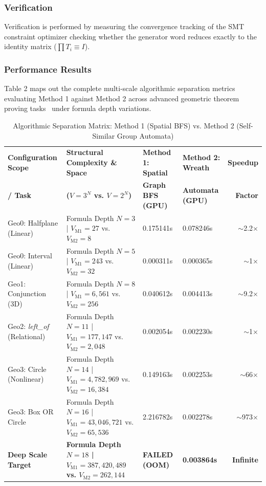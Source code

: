 \documentclass[twocolumn]{article}
\begin{document}
\subsubsection{Verification}
Verification is performed by measuring the convergence tracking of the SMT constraint optimizer checking whether the generator word reduces exactly to the identity matrix ($\prod T_i \equiv I$).

\subsubsection{Performance Results}
Table 2 maps out the complete multi-scale algorithmic separation metrics evaluating Method 1 against Method 2 across advanced geometric theorem proving tasks~\cite{pygol2024} under formula depth variations.

\begin{table}[ht]
\small
\caption{Algorithmic Separation Matrix: Method 1 (Spatial BFS) vs. Method 2 (Self-Similar Group Automata)}
\label{tab:benchmarks}
\centering
\begin{tabularx}{\textwidth}{p{4.2cm}p{4.5cm}XXr}
\toprule
\textbf{Configuration Scope} & \textbf{Structural Complexity \& Space} & \textbf{Method 1: Spatial} & \textbf{Method 2: Wreath} & \textbf{Speedup} \\
\textbf{/ Task} & \textbf{($V = 3^N$ vs. $V = 2^N$)} & \textbf{Graph BFS (GPU)} & \textbf{Automata (GPU)} & \textbf{Factor} \\
\midrule
Geo0: Halfplane (Linear) & Formula Depth $N=3$ | $V_{\text{M1}}=27$ vs. $V_{\text{M2}}=8$ & 0.175141s & 0.078246s & $\sim$2.2$\times$ \\
\addlinespace
Geo0: Interval (Linear) & Formula Depth $N=5$ | $V_{\text{M1}}=243$ vs. $V_{\text{M2}}=32$ & 0.000311s & 0.000365s & $\sim$1$\times$ \\
\addlinespace
Geo1: Conjunction (3D) & Formula Depth $N=8$ | $V_{\text{M1}}=6,561$ vs. $V_{\text{M2}}=256$ & 0.040612s & 0.004413s & $\sim$9.2$\times$ \\
\addlinespace
Geo2: \textit{left\_of} (Relational) & Formula Depth $N=11$ | $V_{\text{M1}}=177,147$ vs. $V_{\text{M2}}=2,048$ & 0.002054s & 0.002230s & $\sim$1$\times$ \\
\addlinespace
Geo3: Circle (Nonlinear) & Formula Depth $N=14$ | $V_{\text{M1}}=4,782,969$ vs. $V_{\text{M2}}=16,384$ & 0.149163s & 0.002253s & $\sim$66$\times$ \\
\addlinespace
Geo3: Box OR Circle & Formula Depth $N=16$ | $V_{\text{M1}}=43,046,721$ vs. $V_{\text{M2}}=65,536$ & 2.216782s & 0.002278s & $\sim$973$\times$ \\
\addlinespace
\textbf{Deep Scale Target} & \textbf{Formula Depth $N=18$ | $V_{\text{M1}}=387,420,489$ vs. $V_{\text{M2}}=262,144$} & \textbf{FAILED (OOM)} & \textbf{0.003864s} & \textbf{Infinite} \\
\bottomrule
\end{tabularx}
\end{table}
\end{document}
